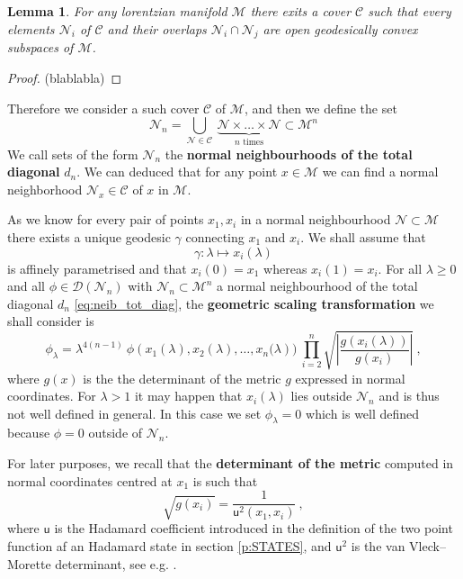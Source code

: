 \documentclass[11pt]{book}
\newcommand{\hilight}[1]{\colorbox{yellow!80!black}{#1}}
\newcommand{\abs}[1]{\left|#1\right|}
\newcommand{\Ccal}{\mathcal{C}}
\newcommand{\Dcal}{\mathcal{D}}
\newcommand{\Mcal}{\mathcal{M}}
\newcommand{\Ncal}{\mathcal{N}}
\newcommand{\usf}{\mathsf{u}}
\theoremstyle{break}
\newtheorem{lemma}{Lemma}[chapter]
\begin{document}
\begin{lemma}
For any lorentzian manifold $\Mcal$ there exits a cover $\Ccal$ such that every elements $\Ncal_i$ of $\Ccal$ and their overlaps $\Ncal_i \cap \Ncal_j$ are open geodesically convex subspaces of $\Mcal$.
\end{lemma}



\begin{proof}
\hilight{(blablabla)}
\end{proof}



Therefore we consider a such cover $\Ccal$ of $\Mcal$, and then we define the set
%
\begin{equation}
\Ncal_{n} = \bigcup_{\Ncal\in\Ccal} \ \underbrace{\Ncal \times \dots \times \Ncal}_{n \mbox{ times}} \subset \Mcal^n 
\label{eq:neib_tot_diag}
\end{equation}
%
We call sets of the form $\Ncal_n$ the \textbf{normal neighbourhoods of the total diagonal} $d_n$. We can deduced that for any point $x \in \Mcal$ we can find a normal neighborhood $\Ncal_x \in \Ccal$ of $x$ in $\Mcal$. 


As we know for every pair of points $x_1,x_i$ in a normal neighbourhood $\Ncal \subset \Mcal$ there exists a unique geodesic $\gamma$ connecting $x_1$ and $x_i$. We shall assume that
%
\begin{equation*}
\gamma : \lambda \mapsto x_i(\lambda) 
\end{equation*}
%
is affinely parametrised and that $x_i(0) =x_1$ whereas $x_i(1) = x_i$. For all $\lambda \geq 0$ and all $\phi \in \Dcal(\Ncal_n)$ with $\Ncal_n \subset \Mcal^n$ a normal neighbourhood of the total diagonal $d_n$ \eqref{eq:neib_tot_diag}, the \textbf{geometric scaling transformation} we shall consider is
%
\begin{equation}
\phi_\lambda = \lambda^{4(n-1)} \ \phi\left(x_1(\lambda ),x_2(\lambda ),\dots,x_n(\lambda\right)) \ \prod_{i=2}^n \sqrt{\abs{\frac{g(x_i(\lambda ))}{g(x_i)}}} \ ,
\label{eq:geo_scaling_transfo}
\end{equation}
%
where $g(x)$ is the the determinant of the metric $g$ expressed in normal coordinates. For $\lambda > 1$ it may happen that $x_i(\lambda)$ lies outside $\Ncal_n$ and is thus not well defined in general. In this case we set $\phi_\lambda = 0$ which is well defined because $\phi = 0$ outside of $\Ncal_n$.


For later purposes, we recall that the \textbf{determinant of the metric} computed in normal coordinates centred at $x_1$ is such that
%
\begin{equation*}
\sqrt{g(x_i)} = \frac{1}{\usf^2(x_1,x_i)} \ , 
\end{equation*}
%
where $\usf$ is the Hadamard coefficient introduced in the definition of the two point function af an Hadamard state in section \ref{p:STATES}, and $\usf^2$ is the van Vleck--Morette determinant, see e.g. \cite{poisson_motion_2011}.
\end{document}
